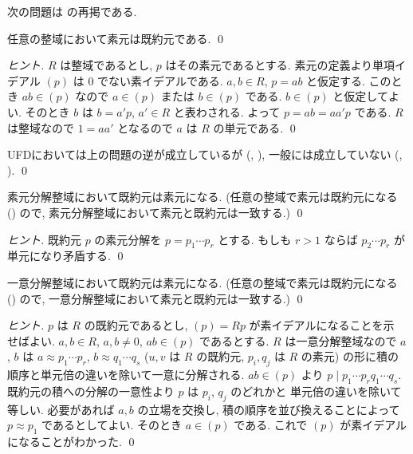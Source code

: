 \documentclass[12pt,twoside]{jarticle}
\begin{document}
次の問題は  の再掲である.

\begin{question}[任意の整域において素元は既約元, 簡単]
 \label{q:prime=>irred}
 任意の整域において素元は既約元である. \qed
\end{question}

\begin{proof}[ヒント]
 $R$ は整域であるとし, $p$ はその素元であるとする. %
 素元の定義より単項イデアル $(p)$ は $0$ でない素イデアルである. 
 $a,b\in R$, $p=ab$ と仮定する.
 このとき $ab\in (p)$ なので $a\in(p)$ または $b\in(p)$ である.
 $b\in (p)$ と仮定してよい.
 そのとき $b$ は $b=a'p$, $a'\in R$ と表わされる. 
 よって $p=ab=aa'p$ である. 
 $R$ は整域なので $1=aa'$ となるので $a$ は $R$ の単元である.
 \qed
\end{proof}

\begin{rem}
 UFDにおいては上の問題の逆が成立しているが
 (, ), 
 一般には成立していない
 (, 
  ).
 \qed
\end{rem}

\begin{question}[簡単]
\label{q:FD,irred=>prime}
 素元分解整域において既約元は素元になる.
 (任意の整域で素元は既約元になる () ので,
 素元分解整域において素元と既約元は一致する.)
 \qed
\end{question}

\begin{proof}[ヒント]
 既約元 $p$ の素元分解を $p=p_1\cdots p_r$ とする.
 もしも $r>1$ ならば $p_2\cdots p_r$ が単元になり矛盾する.
 \qed
\end{proof}

\begin{question}
\label{q:UFD,irred=>prime}
 一意分解整域において既約元は素元になる. 
 (任意の整域で素元は既約元になる () ので,
 一意分解整域において素元と既約元は一致する.)
 \qed
\end{question}

\begin{proof}[ヒント]
 $p$ は $R$ の既約元であるとし, $(p)=Rp$ が素イデアルになることを示
 せばよい. $a,b\in R$, $a,b\ne 0$, $ab\in(p)$ であるとする.
 $R$ は一意分解整域なので $a$, $b$ は
 $a\approx p_1\cdots p_r$, $b\approx q_1\cdots q_s$ 
 ($u,v$ は $R$ の既約元, $p_i,q_j$ は $R$ の素元) 
 の形に積の順序と単元倍の違いを除いて一意に分解される.
 $ab\in(p)$ より $p\mid p_1\cdots p_rq_1\cdots q_s$.
 既約元の積への分解の一意性より $p$ は $p_i$, $q_j$ のどれかと
 単元倍の違いを除いて等しい. 必要があれば $a,b$ の立場を交換し, 
 積の順序を並び換えることによって $p\approx p_1$ であるとしてよい.
 そのとき $a\in(p)$ である. これで $(p)$ が素イデアルになることがわかった.
 \qed
\end{proof}
\end{document}
